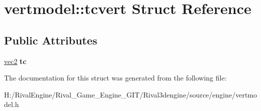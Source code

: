 \hypertarget{structvertmodel_1_1tcvert}{}\section{vertmodel\+:\+:tcvert Struct Reference}
\label{structvertmodel_1_1tcvert}
\subsection*{Public Attributes}
\begin{DoxyCompactItemize}
\item 
\mbox{\label{structvertmodel_1_1tcvert_a2fa0a0ed3eaac2c156c592761177cb86}} 
\hyperlink{structvec2}{vec2} {\bfseries tc}
\end{DoxyCompactItemize}


The documentation for this struct was generated from the following file\+:\begin{DoxyCompactItemize}
\item 
H\+:/\+Rival\+Engine/\+Rival\+\_\+\+Game\+\_\+\+Engine\+\_\+\+G\+I\+T/\+Rival3dengine/source/engine/vertmodel.\+h\end{DoxyCompactItemize}
